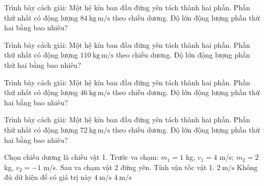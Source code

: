 \begin{bt}
Trình bày cách giải: Một hệ kín ban đầu đứng yên tách thành hai phần. Phần thứ nhất có động lượng $84\ \mathrm{kg\,m/s}$ theo chiều dương. Độ lớn động lượng phần thứ hai bằng bao nhiêu?
\end{bt}

\begin{bt}
Trình bày cách giải: Một hệ kín ban đầu đứng yên tách thành hai phần. Phần thứ nhất có động lượng $110\ \mathrm{kg\,m/s}$ theo chiều dương. Độ lớn động lượng phần thứ hai bằng bao nhiêu?
\end{bt}

\begin{bt}
Trình bày cách giải: Một hệ kín ban đầu đứng yên tách thành hai phần. Phần thứ nhất có động lượng $46\ \mathrm{kg\,m/s}$ theo chiều dương. Độ lớn động lượng phần thứ hai bằng bao nhiêu?
\end{bt}

\begin{bt}
Trình bày cách giải: Một hệ kín ban đầu đứng yên tách thành hai phần. Phần thứ nhất có động lượng $72\ \mathrm{kg\,m/s}$ theo chiều dương. Độ lớn động lượng phần thứ hai bằng bao nhiêu?
\end{bt}

\begin{ex}
Chọn chiều dương là chiều vật 1. Trước va chạm: $m_1=1$ kg, $v_1=4$ m/s; $m_2=2$ kg, $v_2=-1$ m/s. Sau va chạm vật 2 đứng yên. Tính vận tốc vật 1.
\choice
{\True $2\ \mathrm{m/s}$}
{Không đủ dữ kiện để có giá trị này}
{$4\ \mathrm{m/s}$}
{$4\ \mathrm{m/s}$}
\end{ex}

